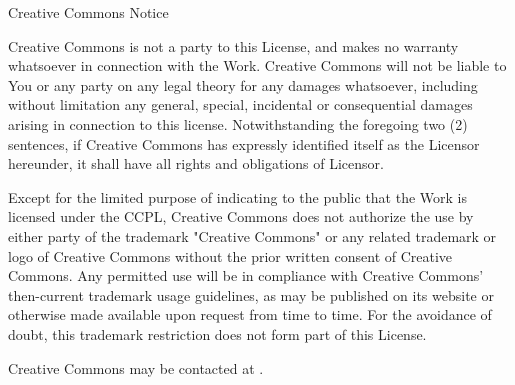 Creative Commons Notice

    Creative Commons is not a party to this License, and makes no warranty
    whatsoever in connection with the Work. Creative Commons will not be
    liable to You or any party on any legal theory for any damages
    whatsoever, including without limitation any general, special,
    incidental or consequential damages arising in connection to this
    license. Notwithstanding the foregoing two (2) sentences, if Creative
    Commons has expressly identified itself as the Licensor hereunder, it
    shall have all rights and obligations of Licensor.

    Except for the limited purpose of indicating to the public that the
    Work is licensed under the CCPL, Creative Commons does not authorize
    the use by either party of the trademark "Creative Commons" or any
    related trademark or logo of Creative Commons without the prior
    written consent of Creative Commons. Any permitted use will be in
    compliance with Creative Commons' then-current trademark usage
    guidelines, as may be published on its website or otherwise made
    available upon request from time to time. For the avoidance of doubt,
    this trademark restriction does not form part of this License.

    Creative Commons may be contacted at .

